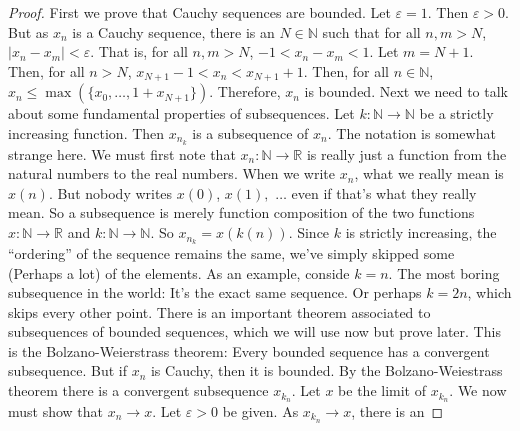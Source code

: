 \documentclass[crop=false,class=article,oneside]{standalone}
\begin{document}
            \begin{proof}
                First we prove that Cauchy sequences are bounded.
                Let $\varepsilon=1$. Then $\varepsilon>0$. But
                as $x_{n}$ is a Cauchy sequence, there is an
                $N\in\mathbb{N}$ such that for all $n,m>N$,
                $|x_{n}-x_{m}|<\varepsilon$. That is, for all
                $n,m>N$, $-1<x_{n}-x_{m}<1$. Let $m=N+1$. Then,
                for all $n>N$, $x_{N+1}-1<x_{n}<x_{N+1}+1$.
                Then, for all $n\in\mathbb{N}$,
                $x_{n}\leq\max(\{x_{0},\hdots,1+x_{N+1}\})$. Therefore,
                $x_{n}$ is bounded. Next we need to talk about
                some fundamental properties of subsequences. Let
                $k:\mathbb{N}\rightarrow\mathbb{N}$ be a strictly
                increasing function. Then $x_{n_{k}}$ is a
                subsequence of $x_{n}$. The notation is somewhat
                strange here. We must first note that
                $x_{n}:\mathbb{N}\rightarrow\mathbb{R}$ is really just
                a function from the natural numbers to the real
                numbers. When we write $x_{n}$, what we really
                mean is $x(n)$. But nobody writes $x(0)$, $x(1),$
                $\hdots$ even if that's what they really mean.
                So a subsequence is merely function composition
                of the two functions
                $x:\mathbb{N}\rightarrow\mathbb{R}$
                and $k:\mathbb{N}\rightarrow\mathbb{N}$. So
                $x_{n_{k}}=x(k(n))$. Since $k$ is strictly increasing,
                the ``ordering'' of the sequence remains the same,
                we've simply skipped some
                (Perhaps a lot) of the elements.
                As an example, conside $k=n$. The most boring
                subsequence in the world: It's the exact same
                sequence. Or perhaps $k=2n$, which skips every other
                point. There is an important theorem associated
                to subsequences of bounded sequences, which we will
                use now but prove later. This is the
                Bolzano-Weierstrass theorem: Every bounded sequence
                has a convergent subsequence. But if $x_{n}$ is
                Cauchy, then it is bounded. By the
                Bolzano-Weiestrass theorem there is a convergent
                subsequence $x_{k_{n}}$. Let $x$ be the limit of
                $x_{k_{n}}$. We now must show that
                $x_{n}\rightarrow{x}$. Let $\varepsilon>0$ be given.
                As $x_{k_{n}}\rightarrow{x}$, there is an

\end{proof}
\end{document}

